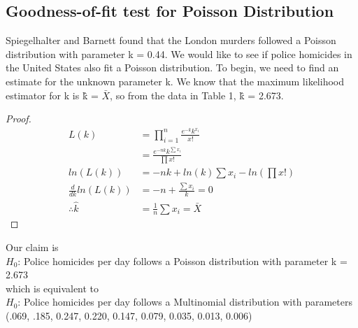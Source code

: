 \documentclass[12pt, titlepage]{article}
\begin{document}
\subsection{Goodness-of-fit test for Poisson Distribution}
Spiegelhalter and Barnett \cite{barnett} found that the London murders followed a Poisson distribution with parameter k = 0.44. We would like to see if police homicides in the United States also fit a Poisson distribution. To begin, we need to find an estimate for the unknown parameter k. We know that the maximum likelihood estimator for k is \^{k} = $\bar{X}$, so from the data in Table 1, \^{k} = 2.673.
\begin{proof}
\begin{equation}
\begin{split}
L(k) & = \prod_{i = 1}^{n}\frac{e^{-k}k^{x_i}}{x!} \\
& = \frac{e^{-nk}k^{\sum x_i}}{\prod x!}\\
ln(L(k)) & = -nk + ln(k)\sum x_i - ln(\prod x!) \\
\frac{d}{dk} ln(L(k)) & = -n + \frac{\sum x_i}{k} = 0 \\
\therefore \hat{k} & = \frac{1}{n}\sum x_i = \bar{X}
\end{split}
\end{equation}
\end{proof}

\pagebreak

\noindent Our claim is \\
$H_0$: Police homicides per day follows a Poisson distribution with parameter k = 2.673 \\
which is equivalent to \\
$H_0$: Police homicides per day follows a Multinomial distribution with parameters (.069, .185, 0.247, 0.220, 0.147, 0.079, 0.035, 0.013, 0.006)\\
\end{document}
